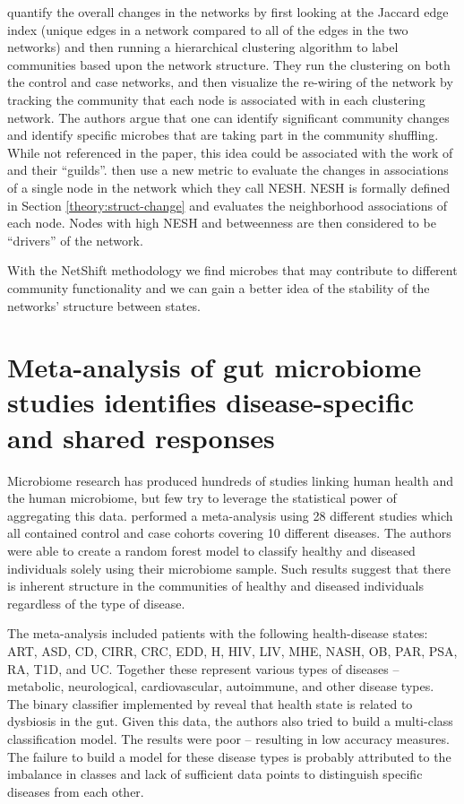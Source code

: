 \citeauthor{Kuntal2018} quantify the overall changes in the networks by first looking at the Jaccard edge index (unique edges in a network compared to all of the edges in the two networks) and then running a hierarchical clustering algorithm to label communities based upon the network structure. They run the clustering on both the control and case networks, and then visualize the re-wiring of the network by tracking the community that each node is associated with in each clustering network. The authors argue that one can identify significant community changes and identify specific microbes that are taking part in the community shuffling. While not referenced in the paper, this idea could be associated with the work of \citet{Goldford2018} and their ``guilds''. \citeauthor{Kuntal2018} then use a new metric to evaluate the changes in associations of a single node in the network which they call \acrfull{NESH}. \acrshort{NESH} is formally defined in Section \ref{theory:struct-change} and evaluates the neighborhood associations of each node. Nodes with high \acrshort{NESH} and betweenness are then considered to be ``drivers'' of the network. 

With the NetShift methodology we find microbes that may contribute to different community functionality and we can gain a better idea of the stability of the networks' structure between states. 

\section{Meta-analysis of gut microbiome studies identifies disease-specific and shared responses}\label{relate-meta}

Microbiome research has produced hundreds of studies linking human health and the human microbiome, but few try to leverage the statistical power of aggregating this data. \citet{Duvallet2017} performed a meta-analysis using 28 different studies which all contained control and case cohorts covering 10 different diseases. The authors were able to create a random forest model to classify healthy and diseased individuals solely using their microbiome sample. Such results suggest that there is inherent structure in the communities of healthy and diseased individuals regardless of the type of disease.

The meta-analysis included patients with the following health-disease states: \acrfull{ART}, \acrfull{ASD}, \acrfull{CD}, \acrfull{CIRR}, \acrfull{CRC}, \acrfull{EDD}, \acrfull{H}, \acrfull{HIV}, \acrfull{LIV}, \acrfull{MHE}, \acrfull{NASH}, \acrfull{OB}, \acrfull{PAR}, \acrfull{PSA}, \acrfull{RA}, \acrfull{T1D}, and \acrfull{UC}. Together these represent various types of diseases -- metabolic, neurological, cardiovascular, autoimmune, and other disease types. The binary classifier implemented by \citeauthor{Duvallet2017} reveal that health state is related to dysbiosis in the gut. Given this data, the authors also tried to build a multi-class classification model. The results were poor -- resulting in low accuracy measures. The failure to build a model for these disease types is probably attributed to the imbalance in classes and lack of sufficient data points to distinguish specific diseases from each other.  

